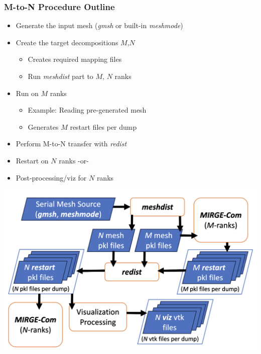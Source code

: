 \begin{frame}\frametitle{M-to-N Procedure Outline}
\begin{minipage}{0.49\textwidth}
\begin{itemize}
\item Generate the input mesh (\textit{gmsh} or built-in \textit{meshmode})
\item Create the target decompositions $M$,$N$
  \begin{itemize}
  \item Creates required mapping files
  \item Run \textit{meshdist} part to $M$, $N$ ranks
  \end{itemize}
\item Run \mirgecom{} on $M$ ranks
\begin{itemize}
\item Example: Reading pre-generated mesh
\item Generates $M$ restart files per dump
\end{itemize}
\item Perform M-to-N transfer with \textit{redist}
\item Restart \mirgecom{} on $N$ ranks -or-
\item Post-processing/viz for $N$ ranks
\end{itemize}
\end{minipage}
\hfill
\begin{minipage}{.49\textwidth}
\includegraphics[width=\textwidth]{Figures/mtc/redist_data_flow_full.png}
\end{minipage}
\end{frame}


